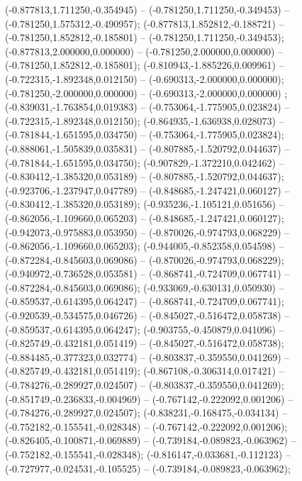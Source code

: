  (-0.877813,1.711250,-0.354945) -- (-0.781250,1.711250,-0.349453) -- (-0.781250,1.575312,-0.490957);
 (-0.877813,1.852812,-0.188721) -- (-0.781250,1.852812,-0.185801) -- (-0.781250,1.711250,-0.349453);
 (-0.877813,2.000000,0.000000) -- (-0.781250,2.000000,0.000000) -- (-0.781250,1.852812,-0.185801);
 (-0.810943,-1.885226,0.009961) -- (-0.722315,-1.892348,0.012150) -- (-0.690313,-2.000000,0.000000);
 (-0.781250,-2.000000,0.000000) -- (-0.690313,-2.000000,0.000000) ;
 (-0.839031,-1.763854,0.019383) -- (-0.753064,-1.775905,0.023824) -- (-0.722315,-1.892348,0.012150);
 (-0.864935,-1.636938,0.028073) -- (-0.781844,-1.651595,0.034750) -- (-0.753064,-1.775905,0.023824);
 (-0.888061,-1.505839,0.035831) -- (-0.807885,-1.520792,0.044637) -- (-0.781844,-1.651595,0.034750);
 (-0.907829,-1.372210,0.042462) -- (-0.830412,-1.385320,0.053189) -- (-0.807885,-1.520792,0.044637);
 (-0.923706,-1.237947,0.047789) -- (-0.848685,-1.247421,0.060127) -- (-0.830412,-1.385320,0.053189);
 (-0.935236,-1.105121,0.051656) -- (-0.862056,-1.109660,0.065203) -- (-0.848685,-1.247421,0.060127);
 (-0.942073,-0.975883,0.053950) -- (-0.870026,-0.974793,0.068229) -- (-0.862056,-1.109660,0.065203);
 (-0.944005,-0.852358,0.054598) -- (-0.872284,-0.845603,0.069086) -- (-0.870026,-0.974793,0.068229);
 (-0.940972,-0.736528,0.053581) -- (-0.868741,-0.724709,0.067741) -- (-0.872284,-0.845603,0.069086);
 (-0.933069,-0.630131,0.050930) -- (-0.859537,-0.614395,0.064247) -- (-0.868741,-0.724709,0.067741);
 (-0.920539,-0.534575,0.046726) -- (-0.845027,-0.516472,0.058738) -- (-0.859537,-0.614395,0.064247);
 (-0.903755,-0.450879,0.041096) -- (-0.825749,-0.432181,0.051419) -- (-0.845027,-0.516472,0.058738);
 (-0.884485,-0.377323,0.032774) -- (-0.803837,-0.359550,0.041269) -- (-0.825749,-0.432181,0.051419);
 (-0.867108,-0.306314,0.017421) -- (-0.784276,-0.289927,0.024507) -- (-0.803837,-0.359550,0.041269);
 (-0.851749,-0.236833,-0.004969) -- (-0.767142,-0.222092,0.001206) -- (-0.784276,-0.289927,0.024507);
 (-0.838231,-0.168475,-0.034134) -- (-0.752182,-0.155541,-0.028348) -- (-0.767142,-0.222092,0.001206);
 (-0.826405,-0.100871,-0.069889) -- (-0.739184,-0.089823,-0.063962) -- (-0.752182,-0.155541,-0.028348);
 (-0.816147,-0.033681,-0.112123) -- (-0.727977,-0.024531,-0.105525) -- (-0.739184,-0.089823,-0.063962);
